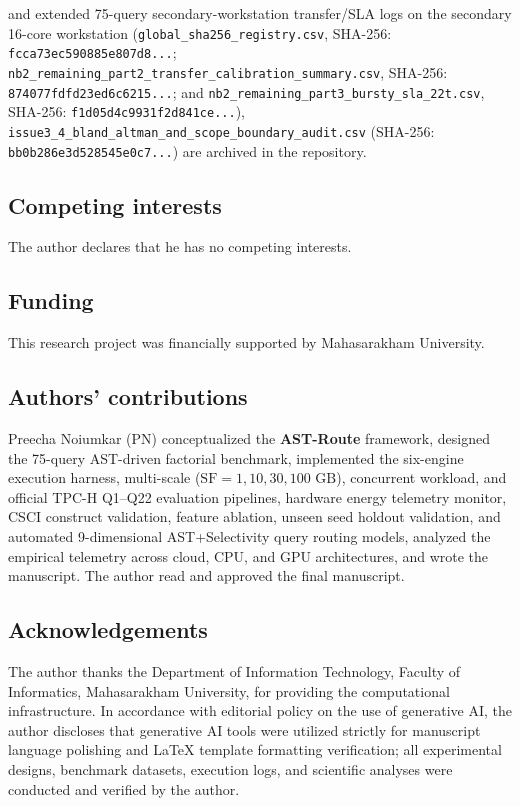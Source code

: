 \documentclass[10pt,a4paper]{article}
\begin{document}
and extended 75-query secondary-workstation transfer/SLA logs on the secondary 16-core workstation (\texttt{global\_sha256\_registry.csv}, SHA-256: \texttt{fcca73ec590885e807d8...}; \texttt{nb2\_remaining\_part2\_transfer\_calibration\_summary.csv}, SHA-256: \texttt{874077fdfd23ed6c6215...}; and \texttt{nb2\_remaining\_part3\_bursty\_sla\_22t.csv}, SHA-256: \texttt{f1d05d4c9931f2d841ce...}), \texttt{issue3\_4\_bland\_altman\_and\_scope\_boundary\_audit.csv} (SHA-256: \texttt{bb0b286e3d528545e0c7...})  are archived in the repository.

\subsection*{Competing interests}
The author declares that he has no competing interests.

\subsection*{Funding}
This research project was financially supported by Mahasarakham University.

\subsection*{Authors' contributions}
Preecha Noiumkar (PN) conceptualized the \textbf{AST-Route} framework, designed the 75-query AST-driven factorial benchmark, implemented the six-engine execution harness, multi-scale ($\text{SF}=1, 10, 30, 100\text{ GB}$), concurrent workload, and official TPC-H Q1--Q22 evaluation pipelines, hardware energy telemetry monitor, CSCI construct validation, feature ablation, unseen seed holdout validation, and automated 9-dimensional AST+Selectivity query routing models, analyzed the empirical telemetry across cloud, CPU, and GPU architectures, and wrote the manuscript. The author read and approved the final manuscript.

\subsection*{Acknowledgements}
The author thanks the Department of Information Technology, Faculty of Informatics, Mahasarakham University, for providing the computational infrastructure. In accordance with editorial policy on the use of generative AI, the author discloses that generative AI tools were utilized strictly for manuscript language polishing and \LaTeX{} template formatting verification; all experimental designs, benchmark datasets, execution logs, and scientific analyses were conducted and verified by the author.
\end{document}
